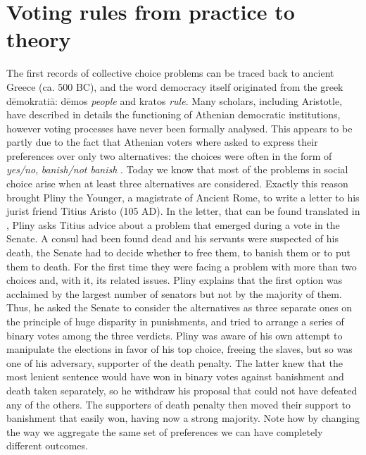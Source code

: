 \section{Voting rules from practice to theory}
The first records of collective choice problems can be traced back to ancient Greece (ca. 500 BC), and the word democracy itself originated from the greek dēmokratiā: dēmos \textit{people} and kratos \textit{rule}. Many scholars, including Aristotle, have described in details the functioning of Athenian democratic institutions, however voting processes have never been formally analysed. This appears to be partly due to the fact that Athenian voters where asked to express their preferences over only two alternatives: the choices were often in the form of \textit{yes/no}, \textit{banish/not banish} \citep{McLeanUrken1995}.
Today we know that most of the problems in social choice arise when at least three alternatives are considered. Exactly this reason brought Pliny the Younger, a magistrate of Ancient Rome, to write a letter to his jurist friend Titius Aristo (105 AD). In the letter, that can be found translated in \citet[Chapter 2]{McLeanUrken1995}, Pliny asks Titius advice about a problem that emerged during a vote in the Senate. 
A consul had been found dead and his servants were suspected of his death, the Senate had to decide whether to free them, to banish them or to put them to death. For the first time they were facing a problem with more than two choices and, with it, its related issues. Pliny explains that the first option was acclaimed by the largest number of senators but not by the majority of them. Thus, he asked the Senate to consider the alternatives as three separate ones on the principle of huge disparity in punishments, and tried to arrange a series of binary votes among the three verdicts. Pliny was aware of his own attempt to manipulate the elections in favor of his top choice, freeing the slaves, but so was one of his adversary, supporter of the death penalty. The latter knew that the most lenient sentence would have won in binary votes against banishment and death taken separately, so he withdraw his proposal that could not have defeated any of the others. The supporters of death penalty then moved their support to banishment that easily won, having now a strong majority. Note how by changing the way we aggregate the same set of preferences we can have completely different outcomes.

